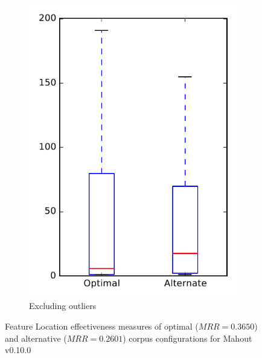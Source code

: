 \begin{figure}
\begin{subfigure}{.4\textwidth}
        \includegraphics[height=0.4\textheight]{figures/combo/flt_rq2_mahout_no_outlier}
        \caption{Excluding outliers}\label{fig:combo:flt:rq2:mahout_no_outlier}
    \end{subfigure}
\caption{Feature Location effectiveness measures of optimal ($MRR=0.3650$) and alternative ($MRR=0.2601$) corpus configurations for Mahout v0.10.0}
\label{fig:combo:flt:rq2:mahout}
\end{figure}
